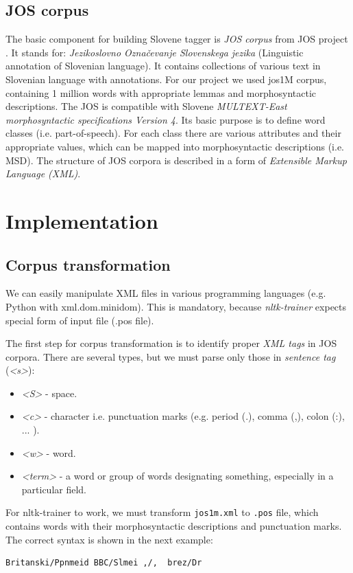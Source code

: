 \documentclass[10pt, conference, compsocconf]{IEEEtran}
\begin{document}
\subsection{JOS corpus} %
The basic component for building Slovene tagger is \textit{JOS corpus} from JOS project \cite{JOS}. It stands for: \textit{Jezikoslovno Označevanje Slovenskega jezika} (Linguistic annotation of Slovenian language).
It contains collections of various text in Slovenian language with annotations.
For our project we used jos1M corpus,  containing 1 million words with appropriate lemmas and morphosyntactic descriptions.
The JOS is compatible with Slovene\textit{ MULTEXT-East morphosyntactic specifications Version 4}\cite{MULTEXT-East}.
Its basic purpose is to define word classes (i.e. part-of-speech).
For each class there are various attributes and their appropriate values, which can be mapped into morphosyntactic descriptions (i.e. MSD).
The structure of JOS corpora is described in a form of \textit{Extensible Markup Language (XML)}.

\section{Implementation}
\label{implementation}
\subsection{Corpus transformation} %
\label{Corpus transformation} 

We can easily manipulate XML files in various programming languages (e.g. Python with xml.dom.minidom).
This is mandatory, because \textit{nltk-trainer}\cite{nltk-trainer} expects special form of input file (.pos file).

The first step for corpus transformation is to identify proper \textit{XML tags}\cite{xml_tags} in JOS corpora. There are several types, but we must parse only those in \textit{sentence tag }(\textit{<s>}):
\begin{itemize}
\item \textit{<S>} - space.
\item \textit{<c>} - character i.e. punctuation marks (e.g. period (.), comma (,), colon (:), ... ).
\item \textit{<w>} - word.
\item \textit{<term>} - a word or group of words designating something, especially in a particular field. 
\end{itemize}

For nltk-trainer to work, we must transform \texttt{jos1m.xml} to \texttt{.pos} file, which contains words with their morphosyntactic descriptions and punctuation marks. The correct syntax is shown in the next example:
\begin{lstlisting}
Britanski/Ppnmeid BBC/Slmei ,/,  brez/Dr 
\end{lstlisting}
\end{document}
